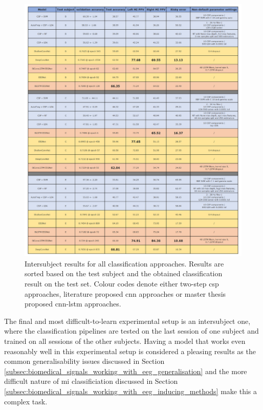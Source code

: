 \begin{figure}[!p]
    \centering
    \includegraphics[width=\linewidth]{../images/results/intersubject.pdf}
    \captionsetup{width=\linewidth}
    \captionsetup{justification=centering}
    \caption{Intersubject results for all classification approaches. Results are sorted based on the test subject and the obtained classification result on the test set. Colour codes denote either two-step \gls{csp} approaches, literature proposed \gls{cnn} approaches or master thesis proposed \gls{cnn}-\gls{lstm} approaches.} 
    \label{fig:results_intersubject}
\end{figure}

The final and most difficult-to-learn experimental setup is an intersubject one, where the classification pipelines are tested on the last session of one subject and trained on all sessions of the other subjects.
Having a model that works even reasonably well in this experimental setup is considered a pleasing results as the common generalisability issues discussed in Section \ref{subsec:biomedical_signals_working_with_eeg_generalisation} and the more difficult nature of \gls{mi} classificiation discussed in Section \ref{subsec:biomedical_signals_working_with_eeg_inducing_methods} make this a complex task.

